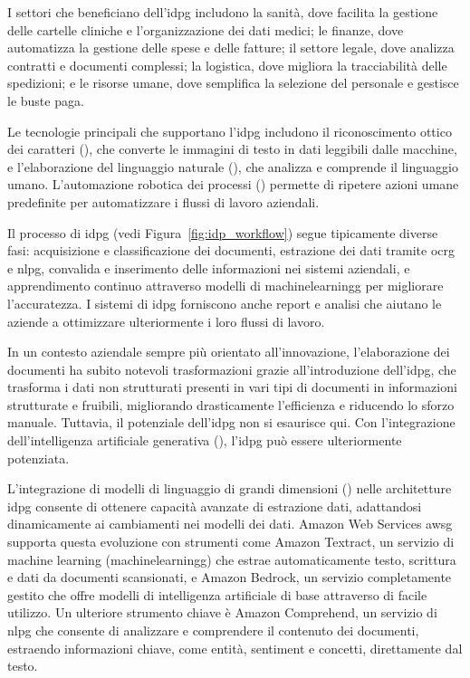 I settori che beneficiano dell'\gls{idpg} includono la sanità, dove facilita la gestione delle cartelle cliniche e l'organizzazione dei dati medici; le finanze, dove automatizza la gestione delle spese e delle fatture; il settore legale, dove analizza contratti e documenti complessi; la logistica, dove migliora la tracciabilità delle spedizioni; e le risorse umane, dove semplifica la selezione del personale e gestisce le buste paga.

Le tecnologie principali che supportano l'\gls{idpg} includono il riconoscimento ottico dei caratteri (), che converte le immagini di testo in dati leggibili dalle macchine, e l'elaborazione del linguaggio naturale (), che analizza e comprende il linguaggio umano. L'automazione robotica dei processi () permette di ripetere azioni umane predefinite per automatizzare i flussi di lavoro aziendali.

Il processo di \gls{idpg} (vedi Figura~\ref{fig:idp_workflow}) segue tipicamente diverse fasi: acquisizione e classificazione dei documenti, estrazione dei dati tramite \gls{ocrg} e \gls{nlpg}, convalida e inserimento delle informazioni nei sistemi aziendali, e apprendimento continuo attraverso modelli di \gls{machinelearningg} per migliorare l'accuratezza. I sistemi di \gls{idpg} forniscono anche report e analisi che aiutano le aziende a ottimizzare ulteriormente i loro flussi di lavoro.

In un contesto aziendale sempre più orientato all'innovazione, l'elaborazione dei documenti ha subito notevoli trasformazioni grazie all'introduzione dell'\gls{idpg}, che trasforma i dati non strutturati presenti in vari tipi di documenti in informazioni strutturate e fruibili, migliorando drasticamente l'efficienza e riducendo lo sforzo manuale. Tuttavia, il potenziale dell'\gls{idpg} non si esaurisce qui. Con l'integrazione dell'intelligenza artificiale generativa (), l'\gls{idpg} può essere ulteriormente potenziata.

L'integrazione di modelli di linguaggio di grandi dimensioni () nelle architetture \gls{idpg} consente di ottenere capacità avanzate di estrazione dati, adattandosi dinamicamente ai cambiamenti nei modelli dei dati. Amazon Web Services \gls{awsg} supporta questa evoluzione con strumenti come Amazon Textract, un servizio di machine learning (\gls{machinelearningg}) che estrae automaticamente testo, scrittura e dati da documenti scansionati, e Amazon Bedrock, un servizio completamente gestito che offre modelli di intelligenza artificiale di base attraverso  di facile utilizzo. Un ulteriore strumento chiave è Amazon Comprehend, un servizio di \gls{nlpg} che consente di analizzare e comprendere il contenuto dei documenti, estraendo informazioni chiave, come entità, sentiment e concetti, direttamente dal testo.

